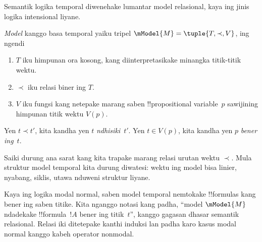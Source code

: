 \documentclass[../../../include/open-logic-section]{subfiles}
\begin{document}
Semantik logika temporal diwenehake lumantar model relasional,
kaya ing jinis logika intensional liyane.

\begin{defn}
  \emph{Model} kanggo basa temporal yaiku tripel
  $\mModel{M} = \tuple{T, \prec, V}$, ing ngendi
  \begin{enumerate}
  \item $T$ iku himpunan ora kosong, kang diinterpretasikake minangka
    titik-titik wektu.
  \item $\prec$ iku relasi biner ing $T$.
  \item $V$ iku fungsi kang netepake marang saben !!{propositional
    variable}~$p$ sawijining himpunan titik wektu $V(p)$.
  \end{enumerate}
  Yen $t \prec t'$, kita kandha yen $t$ \emph{ndhisiki}~$t'$.
  Yen $t \in V(p)$, kita kandha yen $p$ \emph{bener ing}~$t$.
\end{defn}

Saiki durung ana sarat kang kita trapake marang relasi urutan wektu
$\prec$. Mula struktur model temporal kita durung diwatesi: wektu
ing model bisa linier, nyabang, siklis, utawa nduweni struktur liyane.

Kaya ing logika modal normal, saben model temporal nemtokake !!{formula}s
kang bener ing saben titike. Kita nganggo notasi kang padha,
``model $\mModel{M}$ ndadekake !!{formula}~$!A$ bener ing
titik~$t$'', kanggo gagasan dhasar semantik relasional. Relasi iki
ditetepake kanthi induksi lan padha karo kasus modal normal kanggo
kabeh operator nonmodal.
\end{document}
